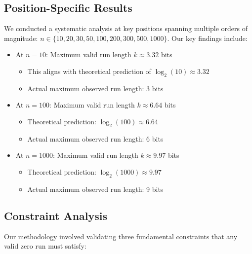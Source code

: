 \subsection{Position-Specific Results}
We conducted a systematic analysis at key positions spanning multiple orders of magnitude:
$n \in \{10, 20, 30, 50, 100, 200, 300, 500, 1000\}$. Our key findings include:
\begin{itemize}
    \item At $n = 10$: Maximum valid run length $k \approx 3.32$ bits
        \begin{itemize}
            \item This aligns with theoretical prediction of $\log_2(10) \approx 3.32$
            \item Actual maximum observed run length: 3 bits
        \end{itemize}
    \item At $n = 100$: Maximum valid run length $k \approx 6.64$ bits
        \begin{itemize}
            \item Theoretical prediction: $\log_2(100) \approx 6.64$
            \item Actual maximum observed run length: 6 bits
        \end{itemize}
    \item At $n = 1000$: Maximum valid run length $k \approx 9.97$ bits
        \begin{itemize}
            \item Theoretical prediction: $\log_2(1000) \approx 9.97$
            \item Actual maximum observed run length: 9 bits
        \end{itemize}
\end{itemize}

\subsection{Constraint Analysis}
Our methodology involved validating three fundamental constraints that any valid zero run must satisfy:

